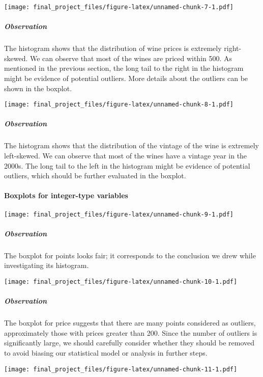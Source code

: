 \documentclass[
]{article}
\begin{document}
\texttt{[image: final\_project\_files/figure-latex/unnamed-chunk-7-1.pdf]}

\hypertarget{observation-1}{%
\subparagraph{Observation}\label{observation-1}}

The histogram shows that the distribution of wine prices is extremely
right-skewed. We can observe that most of the wines are priced within
500. As mentioned in the previous section, the long tail to the right in
the histogram might be evidence of potential outliers. More details
about the outliers can be shown in the boxplot.

\texttt{[image: final\_project\_files/figure-latex/unnamed-chunk-8-1.pdf]}

\hypertarget{observation-2}{%
\subparagraph{Observation}\label{observation-2}}

The histogram shows that the distribution of the vintage of the wine is
extremely left-skewed. We can observe that most of the wines have a
vintage year in the 2000s. The long tail to the left in the histogram
might be evidence of potential outliers, which should be further
evaluated in the boxplot.

\hypertarget{boxplots-for-integer-type-variables}{%
\paragraph{Boxplots for integer-type
variables}\label{boxplots-for-integer-type-variables}}

\texttt{[image: final\_project\_files/figure-latex/unnamed-chunk-9-1.pdf]}

\hypertarget{observation-3}{%
\subparagraph{Observation}\label{observation-3}}

The boxplot for points looks fair; it corresponds to the conclusion we
drew while investigating its histogram.

\texttt{[image: final\_project\_files/figure-latex/unnamed-chunk-10-1.pdf]}

\hypertarget{observation-4}{%
\subparagraph{Observation}\label{observation-4}}

The boxplot for price suggests that there are many points considered as
outliers, approximately those with prices greater than 200. Since the
number of outliers is significantly large, we should carefully consider
whether they should be removed to avoid biasing our statistical model or
analysis in further steps.

\texttt{[image: final\_project\_files/figure-latex/unnamed-chunk-11-1.pdf]}
\end{document}
